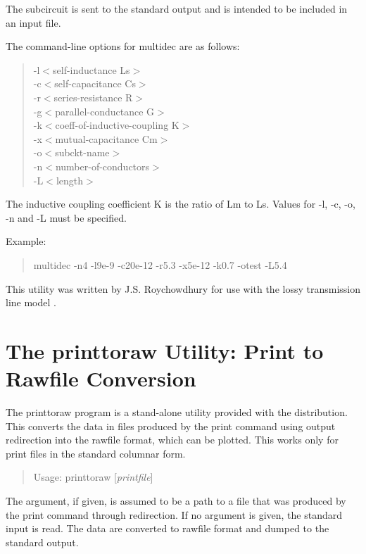 {The subcircuit is sent to the standard output and is intended to be
included in an input file.

The command-line options for {\vt multidec} are as follows:
\begin{quote}
{\vt -l}$<$self-inductance Ls$>$\\
{\vt -c}$<$self-capacitance Cs$>$\\
{\vt -r}$<$series-resistance R$>$\\
{\vt -g}$<$parallel-conductance G$>$\\
{\vt -k}$<$coeff-of-inductive-coupling K$>$\\
{\vt -x}$<$mutual-capacitance Cm$>$\\
{\vt -o}$<$subckt-name$>$\\
{\vt -n}$<$number-of-conductors$>$\\
{\vt -L}$<$length$>$
\end{quote}

The inductive coupling coefficient K is the ratio of Lm
to Ls. Values for -l, -c, -o, -n and -L must be specified.

Example:
\begin{quote}
{\vt multidec -n4 -l9e-9 -c20e-12 -r5.3 -x5e-12 -k0.7 -otest -L5.4}
\end{quote}

This utility was written by J.S.  Roychowdhury for use with the lossy
transmission line model \cite{ltra}.


\section{The {\vt printtoraw} Utility: Print to Rawfile Conversion}


The {\vt printtoraw} program is a stand-alone utility provided with
the {\WRspice} distribution.  This converts the data in files produced
by the {\et print} command using output redirection into the rawfile
format, which can be plotted.  This works only for print files in the
standard columnar form.

\begin{quote}
Usage: {\vt printtoraw} [{\it printfile\/}]
\end{quote}

The argument, if given, is assumed to be a path to a file that was
produced by the {\WRspice} {\et print} command through redirection. 
If no argument is given, the standard input is read.  The data are
converted to rawfile format and dumped to the standard output.

}
